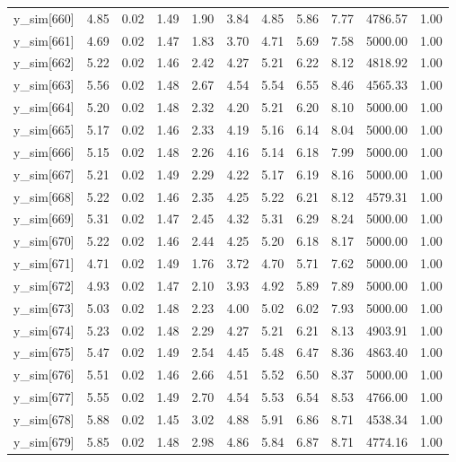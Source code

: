 \begin{table}[ht]
\begin{tabular}{rrrrrrrrrrr}
  y\_sim[660] & 4.85 & 0.02 & 1.49 & 1.90 & 3.84 & 4.85 & 5.86 & 7.77 & 4786.57 & 1.00 \\ 
  y\_sim[661] & 4.69 & 0.02 & 1.47 & 1.83 & 3.70 & 4.71 & 5.69 & 7.58 & 5000.00 & 1.00 \\ 
  y\_sim[662] & 5.22 & 0.02 & 1.46 & 2.42 & 4.27 & 5.21 & 6.22 & 8.12 & 4818.92 & 1.00 \\ 
  y\_sim[663] & 5.56 & 0.02 & 1.48 & 2.67 & 4.54 & 5.54 & 6.55 & 8.46 & 4565.33 & 1.00 \\ 
  y\_sim[664] & 5.20 & 0.02 & 1.48 & 2.32 & 4.20 & 5.21 & 6.20 & 8.10 & 5000.00 & 1.00 \\ 
  y\_sim[665] & 5.17 & 0.02 & 1.46 & 2.33 & 4.19 & 5.16 & 6.14 & 8.04 & 5000.00 & 1.00 \\ 
  y\_sim[666] & 5.15 & 0.02 & 1.48 & 2.26 & 4.16 & 5.14 & 6.18 & 7.99 & 5000.00 & 1.00 \\ 
  y\_sim[667] & 5.21 & 0.02 & 1.49 & 2.29 & 4.22 & 5.17 & 6.19 & 8.16 & 5000.00 & 1.00 \\ 
  y\_sim[668] & 5.22 & 0.02 & 1.46 & 2.35 & 4.25 & 5.22 & 6.21 & 8.12 & 4579.31 & 1.00 \\ 
  y\_sim[669] & 5.31 & 0.02 & 1.47 & 2.45 & 4.32 & 5.31 & 6.29 & 8.24 & 5000.00 & 1.00 \\ 
  y\_sim[670] & 5.22 & 0.02 & 1.46 & 2.44 & 4.25 & 5.20 & 6.18 & 8.17 & 5000.00 & 1.00 \\ 
  y\_sim[671] & 4.71 & 0.02 & 1.49 & 1.76 & 3.72 & 4.70 & 5.71 & 7.62 & 5000.00 & 1.00 \\ 
  y\_sim[672] & 4.93 & 0.02 & 1.47 & 2.10 & 3.93 & 4.92 & 5.89 & 7.89 & 5000.00 & 1.00 \\ 
  y\_sim[673] & 5.03 & 0.02 & 1.48 & 2.23 & 4.00 & 5.02 & 6.02 & 7.93 & 5000.00 & 1.00 \\ 
  y\_sim[674] & 5.23 & 0.02 & 1.48 & 2.29 & 4.27 & 5.21 & 6.21 & 8.13 & 4903.91 & 1.00 \\ 
  y\_sim[675] & 5.47 & 0.02 & 1.49 & 2.54 & 4.45 & 5.48 & 6.47 & 8.36 & 4863.40 & 1.00 \\ 
  y\_sim[676] & 5.51 & 0.02 & 1.46 & 2.66 & 4.51 & 5.52 & 6.50 & 8.37 & 5000.00 & 1.00 \\ 
  y\_sim[677] & 5.55 & 0.02 & 1.49 & 2.70 & 4.54 & 5.53 & 6.54 & 8.53 & 4766.00 & 1.00 \\ 
  y\_sim[678] & 5.88 & 0.02 & 1.45 & 3.02 & 4.88 & 5.91 & 6.86 & 8.71 & 4538.34 & 1.00 \\ 
  y\_sim[679] & 5.85 & 0.02 & 1.48 & 2.98 & 4.86 & 5.84 & 6.87 & 8.71 & 4774.16 & 1.00 \\ 

\end{tabular}
\end{table}
